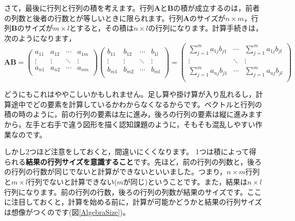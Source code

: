 \documentclass{ltjsbook}
\begin{document}
さて，最後に行列と行列の積を考えます。行列$\bm{A}$と$\bm{B}$の積が成立するのは，前者の列数と後者の行数とが等しいときに限られます。行列$\bm{A}$のサイズが$n \times m$，行列$\bm{B}$のサイズが$m \times l$とすると，その積は$n \times l$の行列になります。計算手続きは，次のようになります，
\begin{equation*}
    \bm{A} \bm{B} =
    \begin{pmatrix}
        a_{11} & a_{12} & \cdots & a_{1m} \\
        \vdots & \vdots & \ddots & \vdots \\
        a_{n1} & a_{n2} & \cdots & a_{nm} \\
    \end{pmatrix}
    \begin{pmatrix}
        b_{11} & b_{12} & \cdots & b_{1l} \\
        \vdots & \vdots & \ddots & \vdots \\
        b_{m1} & b_{m2} & \cdots & b_{ml} \\
    \end{pmatrix}
    =
    \begin{pmatrix}
        \sum_{j=1}^{m} a_{1j} b_{j1} & \cdots & \sum_{j=1}^{m} a_{1j} b_{jl} \\
        \vdots                       & \ddots & \vdots                       \\
        \sum_{j=1}^{m} a_{nj} b_{j1} & \cdots & \sum_{j=1}^{m} a_{nj} b_{jl} \\
    \end{pmatrix}
\end{equation*}


どうにもこれはややこしいかもしれません。足し算や掛け算が入り乱れるし，計算途中でどの要素を計算しているかわからなくなるからです。ベクトルと行列の積の時のように，前の行列の要素は左に進み，後ろの行列の要素は縦に進みますから，左手と右手で違う図形を描く認知課題のように，そもそも混乱しやすい作業なのです。

しかし2つほど注意をしておくと，間違いにくくなります。
1つは積によって得られる\textbf{結果の行列サイズを意識すること}です。先ほど，前の行列の列数と，後ろの行列の行数が同じでないと計算ができないといいました。つまり，$n \times m$行列と$m \times l$行列でないと計算できない($m$が同じ)ということです。また，結果は$n \times l$行列になります。前の行列の行数，後ろの行列の列数が結果のサイズです。ここに注目しておくと，計算を始める前に，計算が可能かどうかと結果の行列サイズは想像がつくのです(図\ref{AlgebraSize})。
\end{document}
